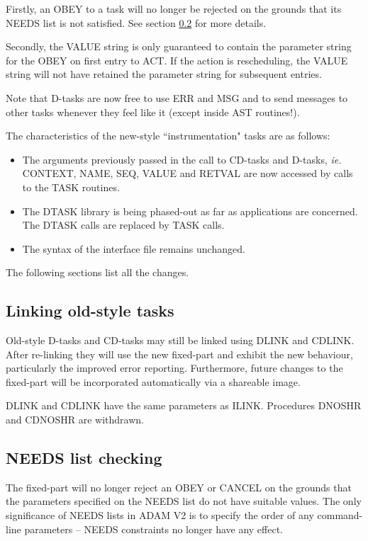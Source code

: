\documentclass[twoside,11pt]{article}
\renewcommand{\_}{\texttt{\symbol{95}}}
\begin{document}
Firstly, an OBEY to a task will no longer be rejected on the grounds
that its NEEDS list is not satisfied. See section \ref{needs} for more details.

Secondly, the VALUE string is only guaranteed to contain the parameter
string for the OBEY on first entry to ACT. If the action is
rescheduling, the VALUE string will not have retained the parameter
string for subsequent entries.

Note that D-tasks are now free to use ERR and MSG and to send messages
to other tasks whenever they feel like it (except inside AST routines!).

The characteristics of the new-style ``instrumentation" tasks are as
follows:
\begin{itemize}
\item The arguments previously passed in the call to CD-tasks and D-tasks,
{\em ie.} CONTEXT, NAME, SEQ, VALUE and RETVAL are now accessed by calls to the
TASK routines.
\item The DTASK library is being phased-out as far as applications are
concerned. The DTASK\_ calls are replaced by TASK\_ calls.
\item The syntax of the interface file remains unchanged.
\end{itemize}
The following sections list all the changes.

\subsection{Linking old-style tasks}

Old-style D-tasks and CD-tasks may still be linked using DLINK and CDLINK.
After re-linking they will use the new fixed-part and exhibit the new
behaviour, particularly the improved error reporting. Furthermore, future
changes to the fixed-part will be incorporated automatically via a shareable
image.

DLINK and CDLINK have the same parameters as ILINK. Procedures DNOSHR and
CDNOSHR are withdrawn.

\subsection{NEEDS list checking}
\label{needs}

The fixed-part will no longer reject an OBEY or CANCEL on the grounds
that the parameters specified on the NEEDS list do not have suitable
values.
The only significance of NEEDS lists in ADAM V2 is to specify the order of any
command-line parameters -- NEEDS constraints no longer have any effect.
\end{document}
